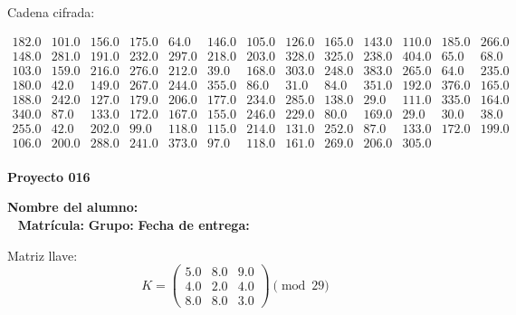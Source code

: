 \documentclass[12pt]{article}
\begin{document}
Cadena cifrada:
\begin{center}
$\begin{array}{lllllllllllll}
182.0 & 101.0 & 156.0 & 175.0 & 64.0 & 146.0 & 105.0 & 126.0 & 165.0 & 143.0 & 110.0 & 185.0 & 266.0\\
148.0 & 281.0 & 191.0 & 232.0 & 297.0 & 218.0 & 203.0 & 328.0 & 325.0 & 238.0 & 404.0 & 65.0 & 68.0\\
103.0 & 159.0 & 216.0 & 276.0 & 212.0 & 39.0 & 168.0 & 303.0 & 248.0 & 383.0 & 265.0 & 64.0 & 235.0\\
180.0 & 42.0 & 149.0 & 267.0 & 244.0 & 355.0 & 86.0 & 31.0 & 84.0 & 351.0 & 192.0 & 376.0 & 165.0\\
188.0 & 242.0 & 127.0 & 179.0 & 206.0 & 177.0 & 234.0 & 285.0 & 138.0 & 29.0 & 111.0 & 335.0 & 164.0\\
340.0 & 87.0 & 133.0 & 172.0 & 167.0 & 155.0 & 246.0 & 229.0 & 80.0 & 169.0 & 29.0 & 30.0 & 38.0\\
255.0 & 42.0 & 202.0 & 99.0 & 118.0 & 115.0 & 214.0 & 131.0 & 252.0 & 87.0 & 133.0 & 172.0 & 199.0\\
106.0 & 200.0 & 288.0 & 241.0 & 373.0 & 97.0 & 118.0 & 161.0 & 269.0 & 206.0 & 305.0\\
\end{array}$
\end{center}

\newpage


\textbf{Proyecto 016}

\textbf{Nombre del alumno:} \underline{\hspace{13cm}}\\\
\vspace{1cm}
\textbf{Matrícula:} \underline{\hspace{4cm}} \hspace{1cm}
\textbf{Grupo:} \underline{\hspace{2cm}}
\textbf{Fecha de entrega:} \underline{\hspace{2cm}}

\medskip

Matriz llave:
\[
K = \begin{pmatrix}
5.0 & 8.0 & 9.0\\
4.0 & 2.0 & 4.0\\
8.0 & 8.0 & 3.0
\end{pmatrix} \pmod{29}
\]
\end{document}
